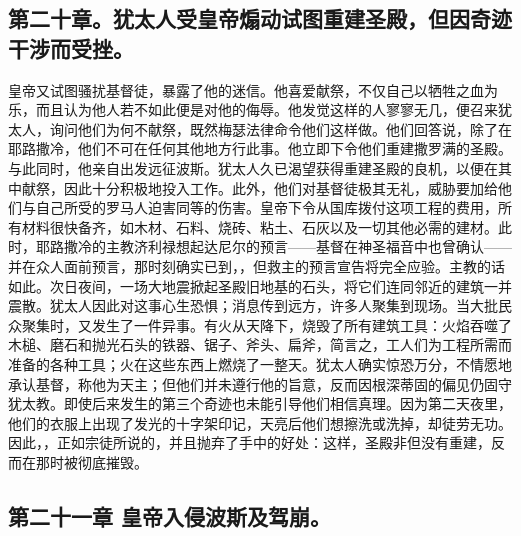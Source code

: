 \subsection{第二十章。犹太人受皇帝煽动试图重建圣殿，但因奇迹干涉而受挫。}

皇帝又试图骚扰基督徒，暴露了他的迷信。他喜爱献祭，不仅自己以牺牲之血为乐，而且认为他人若不如此便是对他的侮辱。他发觉这样的人寥寥无几，便召来犹太人，询问他们为何不献祭，既然梅瑟法律命令他们这样做。他们回答说，除了在耶路撒冷，他们不可在任何其他地方行此事。他立即下令他们重建撒罗满的圣殿。与此同时，他亲自出发远征波斯。犹太人久已渴望获得重建圣殿的良机，以便在其中献祭，因此十分积极地投入工作。此外，他们对基督徒极其无礼，威胁要加给他们与自己所受的罗马人迫害同等的伤害。皇帝下令从国库拨付这项工程的费用，所有材料很快备齐，如木材、石料、烧砖、粘土、石灰以及一切其他必需的建材。此时，耶路撒冷的主教济利禄想起达尼尔的预言——基督在神圣福音中也曾确认——并在众人面前预言，那时刻确实已到，，但救主的预言宣告将完全应验。主教的话如此。次日夜间，一场大地震掀起圣殿旧地基的石头，将它们连同邻近的建筑一并震散。犹太人因此对这事心生恐惧；消息传到远方，许多人聚集到现场。当大批民众聚集时，又发生了一件异事。有火从天降下，烧毁了所有建筑工具：火焰吞噬了木槌、磨石和抛光石头的铁器、锯子、斧头、扁斧，简言之，工人们为工程所需而准备的各种工具；火在这些东西上燃烧了一整天。犹太人确实惊恐万分，不情愿地承认基督，称他为天主；但他们并未遵行他的旨意，反而因根深蒂固的偏见仍固守犹太教。即使后来发生的第三个奇迹也未能引导他们相信真理。因为第二天夜里，他们的衣服上出现了发光的十字架印记，天亮后他们想擦洗或洗掉，却徒劳无功。因此，，正如宗徒所说的，并且抛弃了手中的好处：这样，圣殿非但没有重建，反而在那时被彻底摧毁。\par


\subsection{第二十一章 皇帝入侵波斯及驾崩。}

